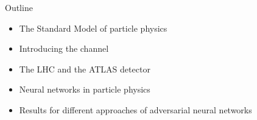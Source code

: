 \begin{frame}{Outline}
\begin{itemize}%
    \item The Standard Model of particle physics
    \vspace{0.5cm}
    \item Introducing the \tW channel
    \vspace{0.5cm}
    \item The LHC and the ATLAS detector
    \vspace{0.5cm}
    \item Neural networks in particle physics
    \vspace{0.5cm}
    \item Results for different approaches of adversarial neural networks
\end{itemize}
\end{frame}